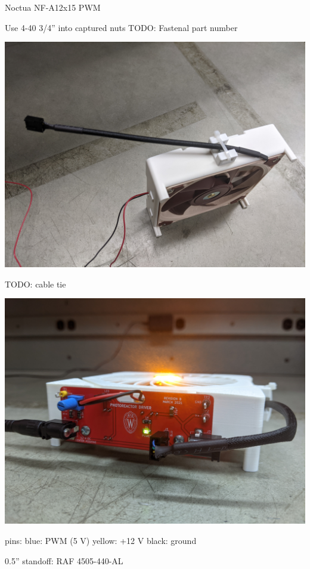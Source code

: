 \documentclass[11pt]{article}
\begin{document}
Noctua NF-A12x15 PWM

Use 4-40 3/4'' into captured nuts TODO: Fastenal part number

\begin{center}
  \includegraphics[width=\textwidth/2]{"./cable-tie.jpg"}
\end{center}


TODO: cable tie

\begin{center}
  \includegraphics[width=\textwidth/2]{"./driver-on-base.jpg"}
\end{center}


pins:
blue: PWM (5 V)
yellow: +12 V
black: ground


0.5'' standoff: RAF 4505-440-AL
\end{document}
